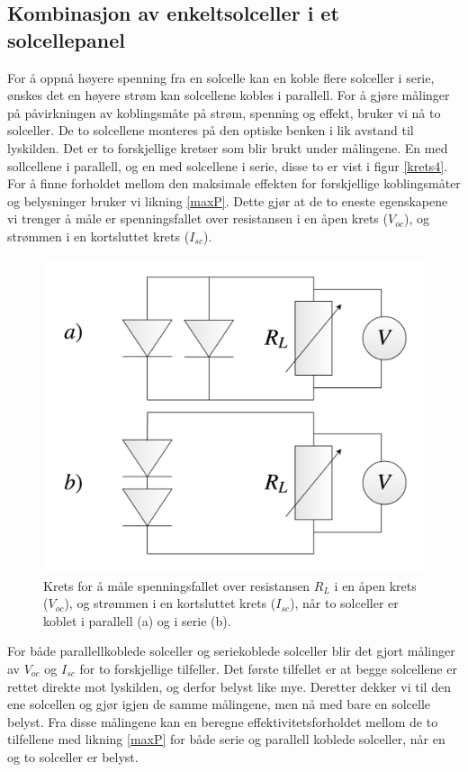 \documentclass[%
 reprint,
 amsmath,amssymb,
 aps,
 norsk,
 booktabs
]{revtex4-1}
\begin{document}
\subsection{Kombinasjon av enkeltsolceller i et solcellepanel}
For å oppnå høyere spenning fra en solcelle kan en koble flere solceller i serie, ønskes det en høyere strøm kan solcellene kobles i parallell. For å gjøre målinger på påvirkningen av koblingsmåte på strøm, spenning og effekt, bruker vi nå to solceller. De to solcellene monteres på den optiske benken i lik avstand til lyskilden. Det er to forskjellige kretser som blir brukt under målingene. En med sollcellene i parallell, og en med solcellene i serie, disse to er vist i figur \vref{krets4}. For å finne forholdet mellom den maksimale effekten for forskjellige koblingsmåter og belysninger bruker vi likning \eqref{maxP}. Dette gjør at de to eneste egenskapene vi trenger å måle er spenningsfallet over resistansen i en åpen krets ($V_{oc}$), og strømmen i en kortsluttet krets ($I_{sc}$).\\
\begin{figure}[h!]
  \centering
  \includegraphics[scale=0.16]{krets4.png}
  \caption{Krets for å måle spenningsfallet over resistansen $R_L$ i en åpen krets ($V_{oc}$), og strømmen i en kortsluttet krets ($I_{sc}$), når to solceller er koblet i parallell (a) og i serie (b).}
  \label{krets4}
\end{figure}
For både parallellkoblede solceller og seriekoblede solceller blir det gjort målinger av $V_{oc}$ og $I_{sc}$ for to forskjellige tilfeller. Det første tilfellet er at begge solcellene er rettet direkte mot lyskilden, og derfor belyst like mye. Deretter dekker vi til den ene solcellen og gjør igjen de samme målingene, men nå med bare en solcelle belyst. Fra disse målingene kan en beregne effektivitetsforholdet mellom de to tilfellene med likning \eqref{maxP} for både serie og parallell koblede solceller, når en og to solceller er belyst.
\end{document}
